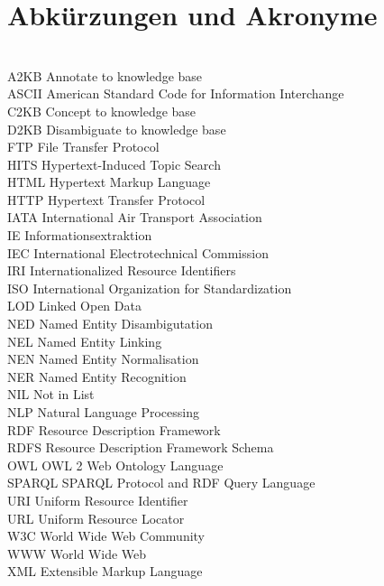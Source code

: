 \section{Abkürzungen und Akronyme}
\label{akro}
\begin{tabbing}
\hspace*{3cm}\=  \\ \kill
A2KB     \> Annotate to knowledge base\\
ASCII    \> American Standard Code for Information Interchange\\
C2KB     \> Concept to knowledge base\\
D2KB     \> Disambiguate to knowledge base\\
FTP      \> File Transfer Protocol\\
HITS     \> Hypertext-Induced Topic Search\\
HTML     \> Hypertext Markup Language\\
HTTP     \> Hypertext Transfer Protocol\\
IATA     \> International Air Transport Association\\
IE       \> Informationsextraktion\\
IEC      \> International Electrotechnical Commission\\
IRI      \> Internationalized Resource Identifiers\\
ISO      \> International Organization for Standardization\\
LOD      \> Linked Open Data\\
NED      \> Named Entity Disambigutation\\
NEL      \> Named Entity Linking\\
NEN      \> Named Entity Normalisation\\
NER      \> Named Entity Recognition\\
NIL      \> Not in List\\
NLP      \> Natural Language Processing\\
RDF      \> Resource Description Framework\\
RDFS     \> Resource Description Framework Schema\\
OWL      \> OWL 2 Web Ontology Language\\
SPARQL   \> SPARQL Protocol and RDF Query Language\\
URI      \> Uniform Resource Identifier\\
URL      \> Uniform Resource Locator\\
W3C      \> World Wide Web Community\\
WWW      \> World Wide Web\\
XML      \> Extensible Markup Language\\
\end{tabbing}
\newpage


